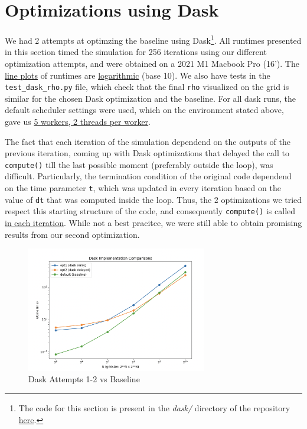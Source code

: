 \documentclass[a4paper,10pt]{article}
\begin{document}
\section{Optimizations using Dask}
We had 2 attempts at optimzing the baseline using Dask\footnote{The code for this section is present in the \textit{dask/} directory of the repository \href{https://github.com/paulmyr/DD2358-HPC25/blob/master/10_project_rishi_paul/code/dask/}{here}.}.
All runtimes presented in this section timed the simulation for 256 iterations using our different optimization attempts, and were obtained on a 2021 M1 Macbook Pro (16').
The \underline{line plots} of runtimes are \underline{logarithmic} (base 10).
We also have tests in the \verb|test_dask_rho.py| file, which check that the final \verb|rho| visualized on the grid is similar for the chosen Dask optimization and the baseline.
For all dask runs, the default scheduler settings were used, which on the environment stated above, gave us \underline{5 workers, 2 threads per worker}.

The fact that each iteration of the simulation dependend on the outputs of the previous iteration, coming up with Dask optimizations that delayed the call to \verb|compute()| till the last possible moment (preferably outside the loop), was difficult.
Particularly, the termination condition of the original code dependend on the time parameter \verb|t|, which was updated in every iteration based on the value of \verb|dt| that was computed inside the loop.
Thus, the 2 optimizations we tried respect this starting structure of the code, and consequently \verb|compute()| is called \underline{in each iteration}.
While not a best pracitce, we were still able to obtain promising results from our second optimization.

\begin{figure}[h]
  \centering
  \includegraphics[width=0.7\textwidth]{images/dask/dask_comparison.png}
  \caption{Dask Attempts 1-2 vs Baseline}
  \label{fig:dask_attempts}
\end{figure}
\end{document}
